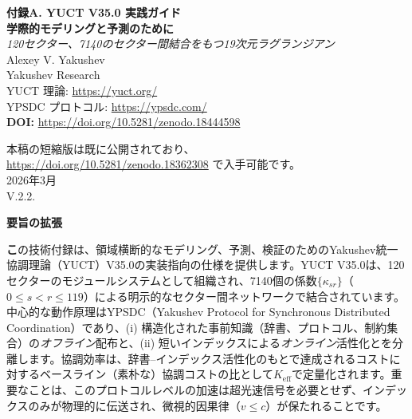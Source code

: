 \documentclass[13pt,a4paper]{ltjsarticle}
\newcommand{\Keff}{K_{\mathrm{eff}}}
\begin{document}
	
	\begin{titlepage}
		\begin{center}
			\vspace*{0.2cm}
			{\Huge\textbf{付録A. 
					YUCT V35.0 実践ガイド\\
					学際的モデリングと予測のために}}\\[0.8cm]
			
			{\Large\textit{120セクター、7140のセクター間結合をもつ19次元ラグランジアン}}\\[1.2cm]
			
			{\Large Alexey V. Yakushev}\\[0.3cm]
			{\large Yakushev Research}\\
			YUCT 理論: \url{https://yuct.org/}\\
			YPSDC プロトコル: \url{https://ypsdc.com/}\\
			
			\vspace{2cm}
			\textbf{DOI:} \url{https://doi.org/10.5281/zenodo.18444598}\\
			
			\vspace{1cm}
			
			\vspace{0cm}
			\large 
			本稿の短縮版は既に公開されており、\\ \url{https://doi.org/10.5281/zenodo.18362308} で入手可能です。\\
			\vspace{1cm}
			2026年3月 \\ \large V.2.2.
			
			\begin{minipage}{0.92\textwidth}
				\begin{center}\large\textbf{要旨の拡張}\\
				\end{center}
				\large\textbf この技術付録は、領域横断的なモデリング、予測、検証のためのYakushev統一協調理論（YUCT）V35.0の実装指向の仕様を提供します。YUCT V35.0は、120セクターのモジュールシステムとして組織され、7140個の係数$\{\kappa_{sr}\}$（$0\le s<r\le 119$）による明示的なセクター間ネットワークで結合されています。中心的な動作原理はYPSDC（Yakushev Protocol for Synchronous Distributed Coordination）であり、(i) 構造化された事前知識（辞書、プロトコル、制約集合）の\emph{オフライン}配布と、(ii) 短いインデックスによる\emph{オンライン}活性化とを分離します。協調効率は、辞書–インデックス活性化のもとで達成されるコストに対するベースライン（素朴な）協調コストの比として$\Keff$で定量化されます。重要なことは、このプロトコルレベルの加速は超光速信号を必要とせず、インデックスのみが物理的に伝送され、微視的因果律（$v\le c$）が保たれることです。
				

\end{minipage}
\end{center}
\end{titlepage}
\end{document}
